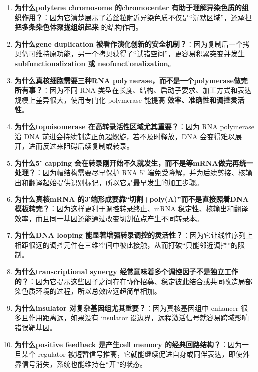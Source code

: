 \documentclass[12pt,fontset=none]{ctexart}
\begin{document}
\begin{enumerate}
\item \textbf{为什么polytene chromosome 的chromocenter 有助于理解异染色质的组织作用？}：因为它清楚展示了着丝粒附近异染色质不仅是“沉默区域”，还承担 \textbf{把多条染色体聚拢组织起来} 的结构作用。

\item \textbf{为什么gene duplication 被看作演化创新的安全机制？}：因为复制后一个拷贝仍可维持原功能，另一个拷贝获得了“试错空间”，更容易积累突变并发生 \textbf{subfunctionalization 或 neofunctionalization}。

\item \textbf{为什么真核细胞需要三种RNA polymerase，而不是一个polymerase做完所有事？}：因为不同 RNA 类型在长度、结构、启动子要求、加工方式和表达规模上差异很大，使用专门化 polymerase 能提高 \textbf{效率、准确性和调控灵活性}。

\item \textbf{为什么topoisomerase 在高转录活性区域尤其重要？}：因为 RNA polymerase 沿 DNA 前进会持续制造正负超螺旋，若不及时释放，DNA 会变得难以展开，进而反过来阻碍后续复制或转录。

\item \textbf{为什么5' capping 会在转录刚开始不久就发生，而不是等mRNA做完再统一处理？}：因为帽结构需要尽早保护 RNA 5' 端免受降解，并为后续剪接、核输出和翻译起始提供识别标记，所以它是最早发生的加工步骤。

\item \textbf{为什么真核mRNA 的3'端形成要靠“切割+poly(A)”而不是直接照着DNA模板转完？}：因为这样更利于调控转录终止、mRNA 稳定性、核输出和翻译效率，而且同一基因还能通过改变切割位点产生不同转录本。

\item \textbf{为什么DNA looping 能显著增强转录调控的灵活性？}：因为它让线性序列上相距很远的调控元件在三维空间中彼此接触，从而打破“只能邻近调控”的限制。

\item \textbf{为什么transcriptional synergy 经常意味着多个调控因子不是独立工作的？}：因为它提示这些因子之间存在协作招募、稳定彼此结合或共同改造局部染色质环境的过程，所以总效应远超简单相加。

\item \textbf{为什么insulator 对复杂基因组尤其重要？}：因为真核基因组中 enhancer 很多且作用距离远，如果没有 insulator 设边界，远程激活信号就容易跨域影响错误靶基因。

\item \textbf{为什么positive feedback 是产生cell memory 的经典回路结构？}：因为一旦某个 regulator 被短暂信号推高，它就能继续促进自身或同伴表达，即使外界信号消失，系统也能维持在“开”的状态。


\end{enumerate}
\end{document}
